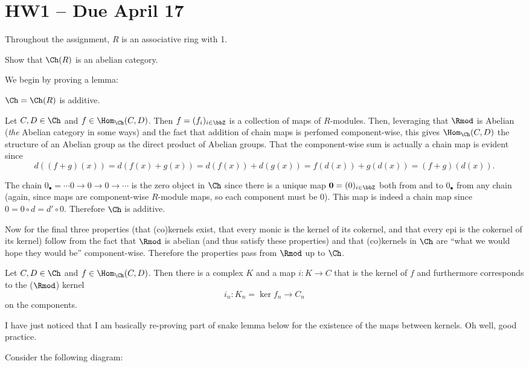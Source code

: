 \documentclass[12pt]{article}
\begin{document}
\section{HW1 -- Due April 17}
Throughout the assignment, $R$ is an associative ring with 1.
\begin{prob}
	Show that $\Ch(R)$ is an abelian category.
\end{prob}
\begin{sol}
	We begin by proving a lemma:
	\begin{lem}\label{lem-chain-additive} 
		$\Ch=\Ch(R)$ is additive. 
	\end{lem}
	\begin{prf}
		Let $C,D\in\Ch$ and $f\in\Hom_{\Ch}(C,D)$. Then 
		$f=(f_i)_{i\in\bbZ}$ is a collection of maps of $R$-modules. Then, leveraging that $\Rmod$ is Abelian
		(\textit{the} Abelian category in some ways) and the fact that addition of chain maps is perfomed 
		component-wise, this gives $\Hom_{\Ch}(C,D)$ the structure of an Abelian group as the direct product
		of Abelian groups. That the component-wise sum is actually a chain map is evident since 
		\[d((f+g)(x))=d(f(x)+g(x))=d(f(x))+d(g(x))=f(d(x))+g(d(x))=(f+g)(d(x)).\]

		The chain $0_\bullet=\cdots 0 \to 0\to 0\to \cdots$ is the zero object in $\Ch$ since there is a 
		unique map $\mathbf{0}=(0)_{i\in\bbZ}$ both from and to $0_\bullet$ from any chain (again, since maps
		are component-wise $R$-module maps, so each component must be $0$). This map is indeed a chain map
		since $0=0\circ d=d'\circ 0$. Therefore $\Ch$ is additive.
	\end{prf}

	\brk

	Now for the final three properties (that (co)kernels exist, that every monic is the kernel of its cokernel,
	and that every epi is the cokernel of its kernel) follow from the fact that $\Rmod$ is abelian (and thus satisfy
	these properties) and that (co)kernels in $\Ch$ are ``what we would hope they would be'' component-wise. 
	Therefore the properties pass from $\Rmod$ up to $\Ch$.

	\begin{lem}\label{lem-chain-ker}
		Let $C,D\in\Ch$ and $f\in\Hom_{\Ch}(C,D)$. Then there is a complex $K$ and a map $i:K\to C$ 
		that is the kernel of $f$ and furthermore corresponds to the ($\Rmod$) kernel 
		\[i_n:K_n=\ker f_n\to C_n\]
		on the components.
	\end{lem}
	\begin{prf}
		\begin{rmk}
		I have just noticed that I am basically re-proving part of snake lemma below for the existence of the maps between
		kernels. Oh well, good practice.
		\end{rmk}
		Consider the following diagram:


\end{prf}
\end{sol}
\end{document}

